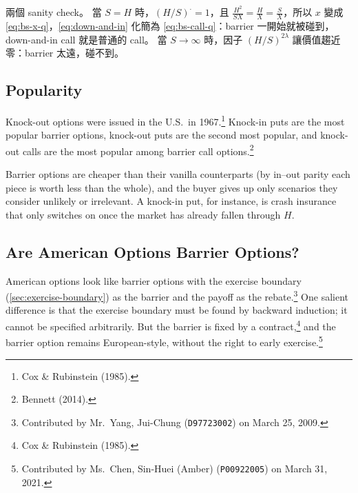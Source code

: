 
\begin{note}
	兩個 sanity check。
	當 $S=H$ 時，$(H/S)^{\cdot}=1$，且 $\frac{H^{2}}{SX}=\frac{H}{X}=\frac{S}{X}$，所以 $x$ 變成 \eqref{eq:bs-x-q}，\eqref{eq:down-and-in} 化簡為 \eqref{eq:bs-call-q}：barrier 一開始就被碰到，down-and-in call 就是普通的 call。
	當 $S\to\infty$ 時，因子 $(H/S)^{2\lambda}$ 讓價值趨近零：barrier 太遠，碰不到。
\end{note}
\suppend

\subsection{Popularity}


Knock-out options were issued in the U.S.\ in 1967.\footnote{Cox \& Rubinstein (1985).}
Knock-in puts are the most popular barrier options, knock-out puts are the second most popular, and knock-out calls are the most popular among barrier call options.\footnote{Bennett (2014).}

\suppstart
{}

\begin{intuition}
	Barrier options are cheaper than their vanilla counterparts (by in--out parity each piece is worth less than the whole), and the buyer gives up only scenarios they consider unlikely or irrelevant.
	A knock-in put, for instance, is crash insurance that only switches on once the market has already fallen through $H$.
\end{intuition}

\suppend

\subsection{Are American Options Barrier Options?}
\label{sec:american-vs-barrier}


American options look like barrier options with the exercise boundary (\autoref{sec:exercise-boundary}) as the barrier and the payoff as the rebate.\footnote{Contributed by Mr.~Yang, Jui-Chung (\texttt{D97723002}) on March 25, 2009.}
One salient difference is that the exercise boundary must be found by backward induction; it cannot be specified arbitrarily.
But the barrier is fixed by a contract,\footnote{Cox \& Rubinstein (1985).} and the barrier option remains European-style, without the right to early exercise.\footnote{Contributed by Ms.~Chen, Sin-Huei (Amber) (\texttt{P00922005}) on March 31, 2021.}

